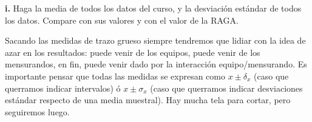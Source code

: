 \documentclass[10pt,a4paper]{article}
\numberwithin{equation}{section}%
\numberwithin{equation}{subsection}
\begin{document}
\noindent \textbf{i.} Haga la media de todos los datos del curso, y la desviación estándar de todos los datos. Compare con sus valores y con el valor de la RAGA.

Sacando las medidas de trazo grueso siempre tendremos que lidiar con la idea de azar en los resultados: puede venir de los equipos, puede venir de los mensurandos, en fin, puede venir dado por la interacción equipo/mensurando. Es importante pensar que todas las medidas se expresan como $x \pm \delta_x$ (caso que querramos indicar intervalos) ó $x \pm \sigma_x$ (caso que querramos indicar desviaciones estándar respecto de una media muestral). Hay mucha tela para cortar, pero seguiremos luego.
\end{document}
